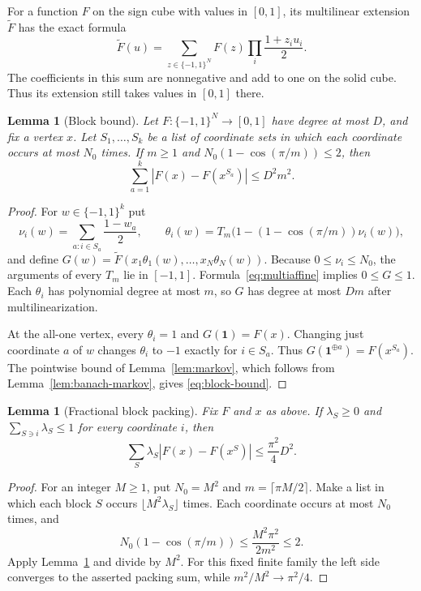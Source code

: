 \documentclass[11pt,reqno]{amsart}
\newtheorem{lemma}[theorem]{Lemma}
\theoremstyle{definition}
\theoremstyle{remark}
\newcommand{\one}{\mathbf 1}
\numberwithin{equation}{section}
\begin{document}
For a function $F$ on the sign cube with values in $[0,1]$, its
multilinear extension $\widetilde F$ has the exact formula
\begin{equation}\label{eq:multiaffine}
 \widetilde F(u)=\sum_{z\in\{-1,1\}^N}
          F(z)\prod_i\frac{1+z_i u_i}{2}.
\end{equation}
The coefficients in this sum are nonnegative and add to one on the
solid cube. Thus its extension still takes values in $[0,1]$ there.

\begin{lemma}[Block bound]\label{lem:blocks}
Let $F\colon\{-1,1\}^N\to[0,1]$ have degree at most $D$, and fix a vertex
$x$. Let $S_1,\ldots,S_k$ be a list of coordinate sets in which each
coordinate occurs at most $N_0$ times. If $m\ge1$ and
$N_0(1-\cos(\pi/m))\le2$, then
\begin{equation}\label{eq:block-bound}
 \sum_{a=1}^k |F(x)-F(x^{S_a})|\le D^2m^2.
\end{equation}
\end{lemma}

\begin{proof}
For $w\in\{-1,1\}^k$ put
\[
 \nu_i(w)=\sum_{a:i\in S_a}\frac{1-w_a}{2},\qquad
 \theta_i(w)=T_m\bigl(1-(1-\cos(\pi/m))\nu_i(w)\bigr),
\]
and define
$G(w)=\widetilde F(x_1\theta_1(w),\ldots,x_N\theta_N(w))$.
Because $0\le\nu_i\le N_0$, the arguments of every $T_m$ lie in
$[-1,1]$. Formula~\eqref{eq:multiaffine} implies $0\le G\le1$.
Each $\theta_i$ has polynomial degree at most $m$, so $G$ has degree
at most $Dm$ after multilinearization.

At the all-one vertex, every $\theta_i=1$ and $G(\one)=F(x)$.
Changing just coordinate $a$ of $w$ changes $\theta_i$ to $-1$
exactly for $i\in S_a$. Thus $G(\one^{\oplus a})=F(x^{S_a})$.
The pointwise bound of Lemma~\ref{lem:markov}, which follows from
Lemma~\ref{lem:banach-markov}, gives \eqref{eq:block-bound}.
\end{proof}

\begin{lemma}[Fractional block packing]\label{lem:packing}
Fix $F$ and $x$ as above. If $\lambda_S\ge0$ and
$\sum_{S\ni i}\lambda_S\le1$ for every coordinate $i$, then
\[
 \sum_S\lambda_S|F(x)-F(x^S)|\le\frac{\pi^2}{4}D^2.
\]
\end{lemma}

\begin{proof}
For an integer $M\ge1$, put $N_0=M^2$ and
$m=\lceil\pi M/2\rceil$. Make a list in which each block $S$ occurs
$\lfloor M^2\lambda_S\rfloor$ times. Each coordinate occurs at most
$N_0$ times, and
\[
 N_0(1-\cos(\pi/m))\le\frac{M^2\pi^2}{2m^2}\le2.
\]
Apply Lemma~\ref{lem:blocks} and divide by $M^2$.
For this fixed finite family the left side converges to the asserted
packing sum, while $m^2/M^2\to\pi^2/4$.
\end{proof}
\end{document}
